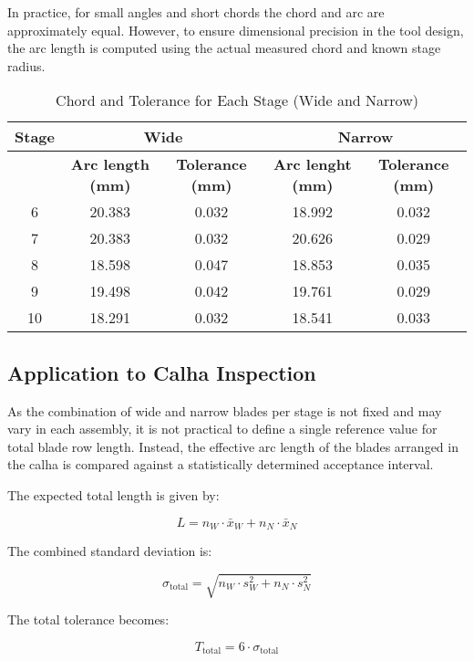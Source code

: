 In practice, for small angles and short chords the chord and arc are approximately equal. 
However, to ensure dimensional precision in the tool design, the arc length is computed using the actual measured chord and known stage radius.

\begin{table}[H]
    \centering
    \caption{Chord and Tolerance for Each Stage (Wide and Narrow)}
    \label{tab:chord_tolerance_per_stage}
    \begin{tabular}{ccccc}
        \hline
        \textbf{Stage} & \multicolumn{2}{c}{\textbf{Wide}} & \multicolumn{2}{c}{\textbf{Narrow}} \\
        \hline
         & \textbf{Arc length (mm)} & \textbf{Tolerance (mm)} & \textbf{Arc lenght (mm)} & \textbf{Tolerance (mm)} \\
        \hline
        6 & 20.383 & 0.032 & 18.992 & 0.032 \\
        7 & 20.383 & 0.032 & 20.626 & 0.029 \\
        8 & 18.598 & 0.047 & 18.853 & 0.035 \\
        9 & 19.498 & 0.042 & 19.761 & 0.029 \\
        10 & 18.291 & 0.032 & 18.541 & 0.033 \\
        \hline
    \end{tabular}
\end{table}



\subsection{Application to Calha Inspection}

As the combination of wide and narrow blades per stage is not fixed and may vary in each assembly, it is not practical to define a single reference value for total blade row length. Instead, the effective arc length of the blades arranged in the calha is compared against a statistically determined acceptance interval.

The expected total length is given by:

\[
L = n_W \cdot \bar{x}_W + n_N \cdot \bar{x}_N
\]

The combined standard deviation is:

\[
\sigma_{\text{total}} = \sqrt{n_W \cdot s_W^2 + n_N \cdot s_N^2}
\]

The total tolerance becomes:

\[
T_{\text{total}} = 6 \cdot \sigma_{\text{total}}
\]

